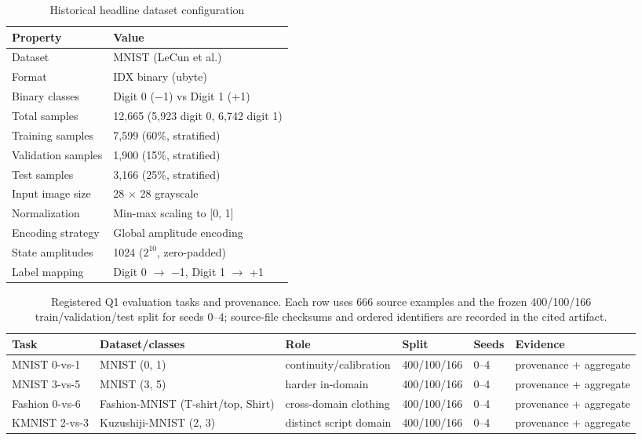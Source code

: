 \documentclass[conference]{IEEEtran}
\begin{document}
\begin{table}[!t]
\caption{Historical headline dataset configuration}
\label{tab:dataset}
\centering
\begin{tabular}{ll}
\toprule
\textbf{Property} & \textbf{Value} \\
\midrule
Dataset & MNIST (LeCun et al.) \\
Format & IDX binary (ubyte) \\
Binary classes & Digit 0 ($-$1) vs Digit 1 (+1) \\
Total samples & 12,665 (5,923 digit 0, 6,742 digit 1) \\
Training samples & 7,599 (60\%, stratified) \\
Validation samples & 1,900 (15\%, stratified) \\
Test samples & 3,166 (25\%, stratified) \\
Input image size & 28 $\times$ 28 grayscale \\
Normalization & Min-max scaling to [0, 1] \\
Encoding strategy & Global amplitude encoding \\
State amplitudes & 1024 ($2^{10}$, zero-padded) \\
Label mapping & Digit 0 $\rightarrow$ $-$1, Digit 1 $\rightarrow$ +1 \\
\bottomrule
\end{tabular}
\end{table}

\begin{table}[!t]
\caption{Registered Q1 evaluation tasks and provenance. Each row uses 666 source examples and the frozen 400/100/166 train/validation/test split for seeds 0--4; source-file checksums and ordered identifiers are recorded in the cited artifact.}
\label{tab:q1data}
\centering
\begin{tabular}{@{}llllll@{}}
\toprule
\textbf{Task} & \textbf{Dataset/classes} & \textbf{Role} & \textbf{Split} & \textbf{Seeds} & \textbf{Evidence} \\
\midrule
MNIST 0-vs-1 & MNIST (0, 1) & continuity/calibration & 400/100/166 & 0--4 & provenance + aggregate \\
MNIST 3-vs-5 & MNIST (3, 5) & harder in-domain & 400/100/166 & 0--4 & provenance + aggregate \\
Fashion 0-vs-6 & Fashion-MNIST (T-shirt/top, Shirt) & cross-domain clothing & 400/100/166 & 0--4 & provenance + aggregate \\
KMNIST 2-vs-3 & Kuzushiji-MNIST (2, 3) & distinct script domain & 400/100/166 & 0--4 & provenance + aggregate \\
\bottomrule
\end{tabular}
\end{table}
\end{document}
